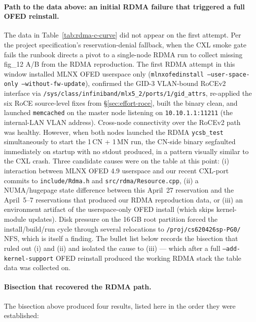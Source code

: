 \documentclass[11pt,a4paper]{article}
\begin{document}
\paragraph{Path to the data above: an initial RDMA failure that triggered a full OFED reinstall.} The data in Table~\ref{tab:rdma-c-curve} did not appear on the first attempt. Per the project specification's reservation-denial fallback, when the CXL smoke gate fails the runbook directs a pivot to a single-node RDMA run to collect missing fig\_12 A/B from the RDMA reproduction. The first RDMA attempt in this window installed MLNX OFED userspace only (\texttt{mlnxofedinstall --user-space-only --without-fw-update}), confirmed the GID-3 VLAN-bound RoCEv2 interface via \texttt{/sys/class/infiniband/mlx5\_2/ports/1/gid\_attrs}, re-applied the six RoCE source-level fixes from §\ref{sec:effort-roce}, built the binary clean, and launched \texttt{memcached} on the master node listening on \texttt{10.10.1.1:11211} (the internal-LAN VLAN address). Cross-node connectivity over the RoCEv2 path was healthy. However, when both nodes launched the RDMA \texttt{ycsb\_test} simultaneously to start the 1\,CN + 1\,MN run, the CN-side binary segfaulted immediately on startup with no stdout produced, in a pattern visually similar to the CXL crash. Three candidate causes were on the table at this point: (i) interaction between MLNX OFED 4.9 userspace and our recent CXL-port commits to \texttt{include/Rdma.h} and \texttt{src/rdma/Resource.cpp}, (ii) a NUMA/hugepage state difference between this April~27 reservation and the April~5--7 reservations that produced our RDMA reproduction data, or (iii) an environment artifact of the userspace-only OFED install (which skips kernel-module updates). Disk pressure on the 16\,GB root partition forced the install/build/run cycle through several relocations to \texttt{/proj/cs620426sp-PG0/} NFS, which is itself a finding. The bullet list below records the bisection that ruled out (i) and (ii) and isolated the cause to (iii) --- which after a full \texttt{--add-kernel-support} OFED reinstall produced the working RDMA stack the table data was collected on.

\paragraph{Bisection that recovered the RDMA path.} The bisection above produced four results, listed here in the order they were established:
\end{document}
